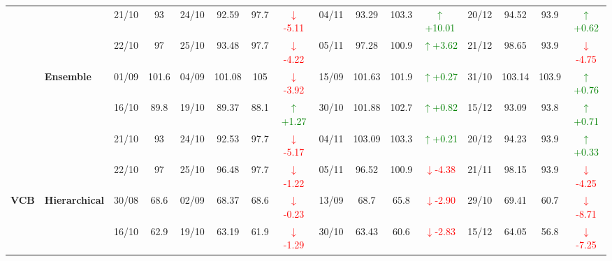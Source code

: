 {\begin{longtable}{llcc|cccc|cccc|cccc}
&
& 21/10 & 93 & 24/10 & 92.59 & 97.7 & \textcolor{red}{\(\downarrow\)-5.11} & 04/11 & 93.29 & 103.3 & \textcolor{green}{\(\uparrow\)+10.01} & 20/12 & 94.52 & 93.9 & \textcolor{green}{\(\uparrow\)+0.62} \\

&
& 22/10 & 97 & 25/10 & 93.48 & 97.7 & \textcolor{red}{\(\downarrow\)-4.22} & 05/11 & 97.28 & 100.9 & \textcolor{green}{\(\uparrow\)+3.62} & 21/12 & 98.65 & 93.9 & \textcolor{red}{\(\downarrow\)-4.75} \\
\cmidrule(lr){2-16}



& \textbf{Ensemble}
& 01/09 & 101.6 & 04/09 & 101.08 & 105 & \textcolor{red}{\(\downarrow\)-3.92} & 15/09 & 101.63 & 101.9 & \textcolor{green}{\(\uparrow\)+0.27} & 31/10 & 103.14 & 103.9 & \textcolor{green}{\(\uparrow\)+0.76} \\

&
& 16/10 & 89.8 & 19/10 & 89.37 & 88.1 & \textcolor{green}{\(\uparrow\)+1.27} & 30/10 & 101.88 & 102.7 & \textcolor{green}{\(\uparrow\)+0.82} & 15/12 & 93.09 & 93.8 & \textcolor{green}{\(\uparrow\)+0.71} \\

&
& 21/10 & 93 & 24/10 & 92.53 & 97.7 & \textcolor{red}{\(\downarrow\)-5.17} & 04/11 & 103.09 & 103.3 & \textcolor{green}{\(\uparrow\)+0.21} & 20/12 & 94.23 & 93.9 & \textcolor{green}{\(\uparrow\)+0.33} \\

&
& 22/10 & 97 & 25/10 & 96.48 & 97.7 & \textcolor{red}{\(\downarrow\)-1.22} & 05/11 & 96.52 & 100.9 & \textcolor{red}{\(\downarrow\)-4.38} & 21/11 & 98.15 & 93.9 & \textcolor{red}{\(\downarrow\)-4.25} \\
\midrule




\multirow{12}{*}{\textbf{VCB}} 
& \textbf{Hierarchical}
& 30/08 & 68.6 & 02/09 & 68.37 & 68.6 & \textcolor{red}{\(\downarrow\)-0.23} & 13/09 & 68.7 & 65.8 & \textcolor{red}{\(\downarrow\)-2.90} & 29/10 & 69.41 & 60.7 & \textcolor{red}{\(\downarrow\)-8.71} \\

&
& 16/10 & 62.9 & 19/10 & 63.19 & 61.9 & \textcolor{red}{\(\downarrow\)-1.29} & 30/10 & 63.43 & 60.6 & \textcolor{red}{\(\downarrow\)-2.83} & 15/12 & 64.05 & 56.8 & \textcolor{red}{\(\downarrow\)-7.25} \\


\end{longtable}}

